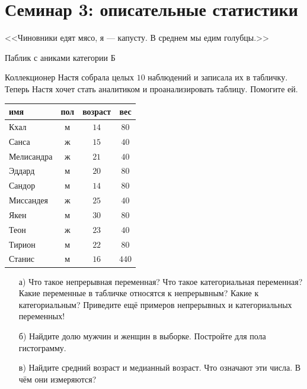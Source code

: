 \documentclass[12pt, a4paper, oneside]{article}
\theoremstyle{plain} %
\theoremstyle{definition}
\newcounter{problem}%
\renewcommand{\theproblem}{\arabic{problem}}
\newenvironment{problem}{
\addtocounter{problem}{1}\noindent{ \color{titleblue} \large \bfseries Упражнение~\theproblem \vspace{1ex} \newline}
}{ }
\begin{document}

\toggletrue{lecture}


\section*{Семинар 3: описательные статистики}

\epigraph{<<Чиновники едят мясо, я — капусту. В среднем мы едим голубцы.>>}{Паблик с аниками категории Б}


\begin{problem}
Коллекционер Настя собрала целых $10$ наблюдений и записала их в табличку. Теперь Настя хочет стать аналитиком и проанализировать таблицу. Помогите ей. 

\begin{center}
	\begin{tabular}{lccc}
		\toprule
		имя & пол  & возраст  & вес  \\ \midrule
		Кхал & м  & $14$ &   $80$  \\
		Санса & ж & $15$ &  $40$  \\
		Мелисандра & ж & $21$ &  $40$   \\
		Эддард & м & $20$ &   $80$ \\
		Сандор & м & $14$ &   $80$ \\
		Миссандея & ж & $25$ &   $40$\\
		Якен & м & $30$ &   $80$\\
		Теон & ж & $23$ &    $40$\\
		Тирион & м & $22$ &    $80$\\
		Станис & м & $16$  &    $440$\\ \bottomrule
	\end{tabular}	
\end{center}

\begin{enumerate}
	\item[а)] Что такое непрерывная переменная? Что такое категориальная переменная? Какие переменные в табличке относятся к непрерывным? Какие к категориальным?  Приведите ещё примеров непрерывных и категориальных переменных! 
	
	\item[б)]  Найдите долю мужчин и женщин в выборке. Постройте для пола гистограмму. 
	
	\item[в)] Найдите средний возраст и медианный возраст.  Что означают эти числа. В чём они измеряются? 


\end{enumerate}
\end{problem}
\end{document}
